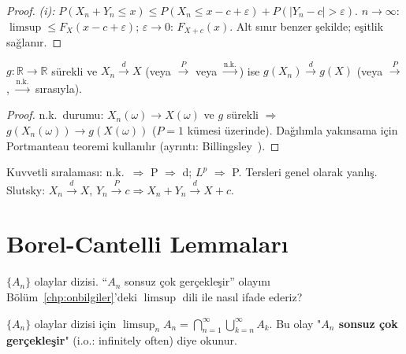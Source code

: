 \begin{proof}
\textit{(i):} $P(X_n + Y_n \leq x) \leq P(X_n \leq x - c + \varepsilon) + P(|Y_n - c| > \varepsilon)$.
$n\to\infty$: $\limsup \leq F_X(x-c+\varepsilon)$; $\varepsilon\to 0$: $F_{X+c}(x)$.
Alt sınır benzer şekilde; eşitlik sağlanır.
\end{proof}

\begin{teorem}
\label{thm:surekli_haritalama}
$g : \mathbb{R} \to \mathbb{R}$ sürekli ve $X_n \xrightarrow{d} X$ (veya $\xrightarrow{P}$ veya $\xrightarrow{\text{n.k.}}$)
ise $g(X_n) \xrightarrow{d} g(X)$ (veya $\xrightarrow{P}$, $\xrightarrow{\text{n.k.}}$ sırasıyla).
\end{teorem}

\begin{proof}
n.k.\ durumu: $X_n(\omega) \to X(\omega)$ ve $g$ sürekli $\Rightarrow$ $g(X_n(\omega)) \to g(X(\omega))$
($P = 1$ kümesi üzerinde).
Dağılımla yakınsama için Portmanteau teoremi kullanılır (ayrıntı: Billingsley~\cite{Billingsley1995}).
\end{proof}

\begin{mikroozet}
Kuvvetli sıralaması: n.k.\ $\Rightarrow$ P $\Rightarrow$ d; $L^p$ $\Rightarrow$ P.
Tersleri genel olarak yanlış. Slutsky: $X_n \xrightarrow{d} X$, $Y_n \xrightarrow{P} c \Rightarrow X_n+Y_n \xrightarrow{d} X+c$.
\end{mikroozet}

\section{Borel-Cantelli Lemmaları}
\label{sec:borel_cantelli}

\begin{kesif}
$\{A_n\}$ olaylar dizisi. ``$A_n$ sonsuz çok gerçekleşir'' olayını
Bölüm~\ref{chp:onbilgiler}'deki $\limsup$ dili ile nasıl ifade ederiz?
\end{kesif}

\begin{tanim}
$\{A_n\}$ olaylar dizisi için $\limsup_n A_n = \bigcap_{n=1}^\infty \bigcup_{k=n}^\infty A_k$.
Bu olay "\textbf{$A_n$ sonsuz çok gerçekleşir}" (i.o.: infinitely often) diye okunur.
\end{tanim}

